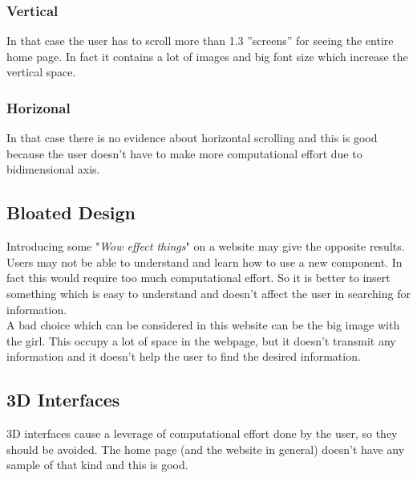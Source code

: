 \subsubsection{Vertical}
In that case the user has to scroll
more than 1.3 ”screens” for seeing the entire home page.
In fact it contains a lot of images and big font size which increase the vertical space.

\subsubsection{Horizonal}
In that case there is no evidence about horizontal scrolling and this is good because the user
doesn't have to make more computational effort due to bidimensional axis.

\subsection{Bloated Design}
\label{bloated-design}
Introducing some "\textit{Wow effect things}" on a website may give the opposite results. Users may
not be able to understand and learn how to use a new component. In fact this would require too
much computational effort. So it is better to insert something which is easy to understand and
doesn't affect the user in searching for information.\\
A bad choice which can be considered in this website can be the big image
with the girl. This occupy a lot of space in the webpage, but it doesn't
transmit any information and it doesn't help the user to find the desired information.

\subsection{3D Interfaces}
3D interfaces cause a leverage of computational effort done by the user, so they should be avoided.
The home page (and the website in general) doesn't have any sample of that kind
and this is good.

